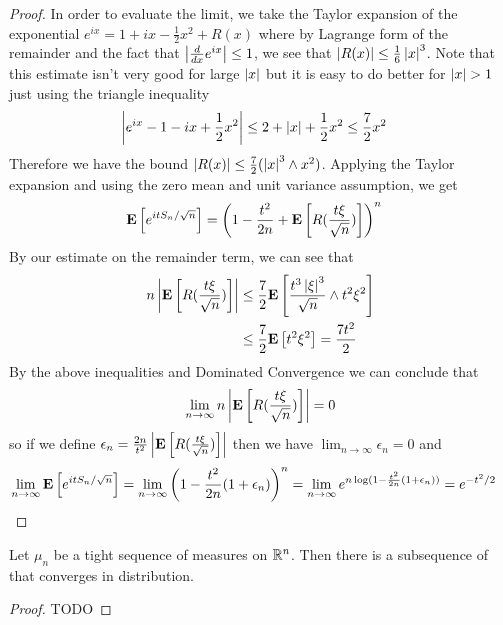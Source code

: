 \begin{proof}
In order to evaluate the limit, we take the Taylor expansion of the exponential $e^{ix} = 1 + i x -
\frac{1}{2}x^2 + R(x)$ where by Lagrange form of the remainder and the
fact that $\left \vert \frac{d}{dx} e^{ix} \right \vert \leq 1$, we
see that $\left \vert R(x) \right \vert \leq \frac{1}{6}\left \vert x \right \vert^3$.  Note that this
estimate isn't very good for large $\left \vert x \right \vert$ but it is easy to do
better for $\left \vert x \right \vert > 1$ just using the triangle inequality
\begin{align*}
\left \vert e^{ix} - 1 - ix + \frac{1}{2}x^2 \right \vert &\leq 2 + \left \vert x \right \vert +
\frac{1}{2}x^2 \leq \frac{7}{2}x^2
\end{align*}
Therefore we have the bound $\left \vert R(x) \right \vert \leq \frac{7}{2}(\left \vert x \right \vert^3
\wedge x^2)$.  Applying the Taylor expansion and using the zero mean
and unit variance assumption, we get
\begin{align*}
\textbf{E}\left[e^{itS_n/\sqrt{n}}\right] &= \left(1 - \frac{t^2}{2n} + \textbf{E}\left[R(\frac{t\xi}{\sqrt{n}})\right]\right)^n
\end{align*}
By our estimate on the remainder term, we can see that
\begin{align*}
n \left \vert \textbf{E}\left[R(\frac{t\xi}{\sqrt{n}})\right] \right \vert &\leq
\frac{7}{2}\textbf{E}\left[\frac{t^3\left \vert \xi \right \vert^3}{\sqrt{n}} \wedge t^2
  \xi^2\right] \\
&\leq \frac{7}{2} \textbf{E}\left[ t^2
  \xi^2\right] = \frac{7t^2}{2} 
\end{align*}
By the above inequalities and Dominated Convergence we can
conclude that 
\begin{align*}
\lim_{n \to \infty} n
\left \vert \textbf{E}\left[R(\frac{t\xi}{\sqrt{n}})\right] \right \vert = 0
\end{align*}
so if we define $\epsilon_n = \frac{2n}{t^2}
\left \vert \textbf{E}\left[R(\frac{t\xi}{\sqrt{n}})\right] \right \vert$ then we have $\lim_{n
  \to \infty} \epsilon_n = 0$ and 
\begin{align*}
\lim_{n \to \infty} \textbf{E}\left[e^{itS_n/\sqrt{n}}\right] &= \lim_{n \to 
  \infty} \left(1 - \frac{t^2}{2n} (1 + \epsilon_n) \right)^n =\lim_{n \to 
  \infty}  e^{n \log(1 - \frac{t^2}{2n} (1 + \epsilon_n))} =
e^{-t^2/2}
\end{align*}
\end{proof}

\begin{thm}Let $\mu_n$ be a tight sequence of
  measures on $\mathbb{R}^n$.  Then there is a subsequence of that
  converges in distribution.
\end{thm}
\begin{proof}
TODO
\end{proof}
 
